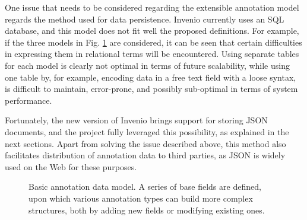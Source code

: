 One issue that needs to be considered regarding the extensible annotation model
regards the method used for data persistence. Invenio currently uses an SQL
database, and this model does not fit well the proposed definitions. For
example, if the three models in Fig. \ref{fig:datamodel} are considered, it can
be seen that certain difficulties in expressing them in relational terms will
be encountered. Using separate tables for each model is clearly not optimal in
terms of future scalability, while using one table by, for example, encoding
data in a free text field with a loose syntax, is difficult to maintain,
error-prone, and possibly sub-optimal in terms of system performance.

Fortunately, the new version of Invenio brings support for storing JSON
documents, and the project fully leveraged this possibility, as explained in the
next sections. Apart from solving the issue described above, this method also
facilitates distribution of annotation data to third parties, as JSON is widely
used on the Web for these purposes.

\begin{figure}[!ht]
  \centering
  \caption[Basic annotation data model]
          {Basic annotation data model. A series of base fields are defined,
           upon which various annotation types can build more complex
           structures, both by adding new fields or modifying existing ones.}
  \label{fig:datamodel}
\end{figure}

